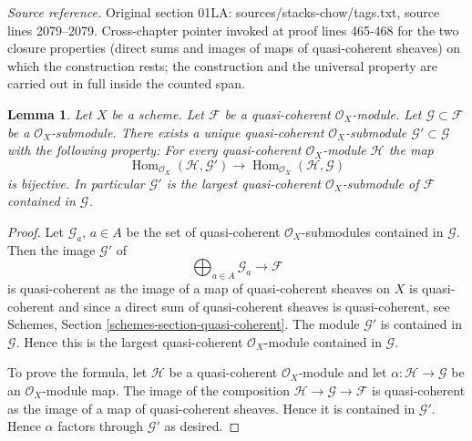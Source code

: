 \documentclass[10pt,a4paper]{amsart}
\theoremstyle{plain}
\newtheorem{lemma}[subsection]{Lemma}
\theoremstyle{definition}
\theoremstyle{remark}
\numberwithin{equation}{subsection}
\def\Hom{\mathop{\mathrm{Hom}}\nolimits}
\begin{document}
\noindent\textit{Source reference.} Original section 01LA: sources/stacks-chow/tags.txt, source lines 2079--2079. Cross-chapter pointer invoked at proof lines 465-468 for the two closure properties (direct sums and images of maps of quasi-coherent sheaves) on which the construction rests; the construction and the universal property are carried out in full inside the counted span.\par\medskip
\begin{lemma}
\label{lemma-largest-quasi-coherent-subsheaf}
Let $X$ be a scheme. Let $\mathcal{F}$ be a quasi-coherent
$\mathcal{O}_X$-module. Let $\mathcal{G} \subset \mathcal{F}$
be a $\mathcal{O}_X$-submodule. There exists a unique quasi-coherent
$\mathcal{O}_X$-submodule $\mathcal{G}' \subset \mathcal{G}$
with the following property: For every quasi-coherent $\mathcal{O}_X$-module
$\mathcal{H}$ the map
$$
\Hom_{\mathcal{O}_X}(\mathcal{H}, \mathcal{G}')
\longrightarrow
\Hom_{\mathcal{O}_X}(\mathcal{H}, \mathcal{G})
$$
is bijective. In particular $\mathcal{G}'$ is the largest quasi-coherent
$\mathcal{O}_X$-submodule of $\mathcal{F}$ contained in $\mathcal{G}$.
\end{lemma}

\begin{proof}
Let $\mathcal{G}_a$, $a \in A$ be the set of quasi-coherent
$\mathcal{O}_X$-submodules contained in $\mathcal{G}$.
Then the image $\mathcal{G}'$ of
$$
\bigoplus\nolimits_{a \in A} \mathcal{G}_a \longrightarrow \mathcal{F}
$$
is quasi-coherent as the image of a map of quasi-coherent sheaves
on $X$ is quasi-coherent and since a direct sum of quasi-coherent sheaves
is quasi-coherent, see
Schemes, Section \ref{schemes-section-quasi-coherent}.
The module $\mathcal{G}'$ is contained in $\mathcal{G}$. Hence this is the
largest quasi-coherent $\mathcal{O}_X$-module contained in $\mathcal{G}$.

\medskip\noindent
To prove the formula, let $\mathcal{H}$ be a quasi-coherent
$\mathcal{O}_X$-module and let $\alpha : \mathcal{H} \to \mathcal{G}$
be an $\mathcal{O}_X$-module map. The image of the composition
$\mathcal{H} \to \mathcal{G} \to \mathcal{F}$ is quasi-coherent
as the image of a map of quasi-coherent sheaves. Hence it is contained
in $\mathcal{G}'$. Hence $\alpha$ factors through $\mathcal{G}'$
as desired.
\end{proof}
\end{document}
